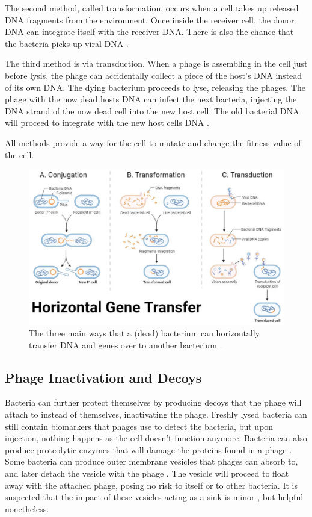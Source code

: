 The second method, called transformation, occurs when a cell takes up released DNA fragments from the environment. 
Once inside the receiver cell, the donor DNA can integrate itself with the receiver DNA. 
There is also the chance that the bacteria picks up viral DNA \cite{chenInsOutsDNA2005}. 

The third method is via transduction. 
When a phage is assembling in the cell just before lysis, the phage can accidentally collect a piece of the host's DNA instead of its own DNA. 
The dying bacterium proceeds to lyse, releasing the phages. 
The phage with the now dead hosts DNA can infect the next bacteria, injecting the DNA strand of the now dead cell into the new host cell. 
The old bacterial DNA will proceed to integrate with the new host cells DNA \cite{tamangHorizontalGeneTransfer2023, kasmanBacteriophages2025}. 

All methods provide a way for the cell to mutate and change the fitness value of the cell.

\begin{figure}[!ht]
    \centering
    \includegraphics[width=0.7\linewidth]{Figures/horizontal_gene_transfer.png}
    \caption{The three main ways that a (dead) bacterium can horizontally transfer DNA and genes over to another bacterium \cite{tamangHorizontalGeneTransfer2023}.}
    \label{fig:horizontal_gene_transfer}
\end{figure}

\subsection{Phage Inactivation and Decoys}
Bacteria can further protect themselves by producing decoys that the phage will attach to instead of themselves, inactivating the phage. 
Freshly lysed bacteria can still contain biomarkers that phages use to detect the bacteria, but upon injection, nothing happens as the cell doesn't function anymore. 
Bacteria can also produce proteolytic enzymes that will damage the proteins found in a phage \cite{tanQuorumSensingDetermines2015}. \newline
Some bacteria can produce outer membrane vesicles that phages can absorb to, and later detach the vesicle with the phage \cite{rabinovitchBacterialDebrisEcological2003}. 
The vesicle will proceed to float away with the attached phage, posing no risk to itself or to other bacteria. 
It is suspected that the impact of these vesicles acting as a sink is minor \cite{bullPhageBacterialDynamicsSpatial2018}, but helpful nonetheless. 


